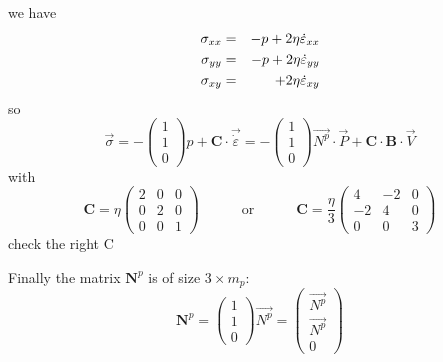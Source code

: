 we have 
\begin{eqnarray}
\sigma_{xx}&=&-p + 2\eta \dot\varepsilon_{xx} \\
\sigma_{yy}&=&-p + 2\eta \dot\varepsilon_{yy} \\
\sigma_{xy}&=& \hspace{5.5mm} + 2\eta \dot\varepsilon_{xy} 
\end{eqnarray}
so
\begin{equation}
\vec{\sigma} 
=-\left( 
\begin{array}{c}
1 \\ 1 \\ 0 
\end{array}
\right) p+ {\bm C} \cdot \vec{\dot\varepsilon}
=
- \left(
\begin{array}{c}
1 \\ 1 \\ 0 
\end{array}
\right)
\vec{N^p} \cdot {\vec P}  + 
{\bm C} \cdot  {\bm B}\cdot {\vec V}
\end{equation}
with
\begin{equation}
{\bm C}=
\eta
\left(
\begin{array}{ccc}
2 & 0 & 0 \\
0 & 2 & 0 \\
0 & 0 & 1  
\end{array}
\right)
\quad\quad\quad
\text{or}
\quad\quad\quad
{\bm C}=
\frac{\eta}{3}
\left(
\begin{array}{ccc}
4 & -2 & 0 \\
-2 & 4 & 0 \\
0 & 0 & 3  
\end{array}
\right)
\end{equation}
{\color{red} check the right C}

Finally the matrix ${\bm N}^p$ is of size $3\times m_p$:
\begin{equation}
{\bm N}^p=
\left(
\begin{array}{c}
1 \\ 1 \\ 0
\end{array}
\right)
\vec{N^p} 
=
\left(
\begin{array}{c}
\vec{N^p} \\
\vec{N^p} \\
0
\end{array}
\right)
\end{equation}



